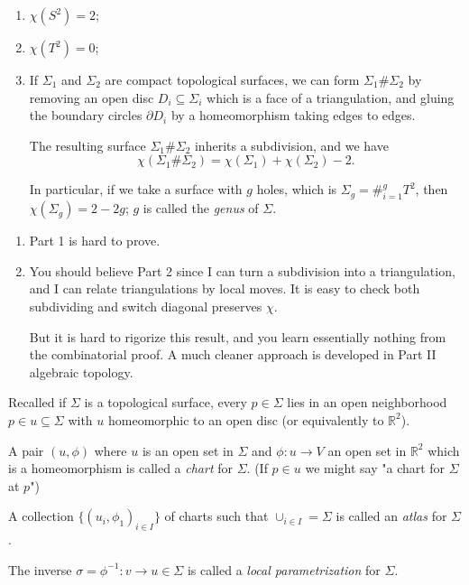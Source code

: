 \begin{example}
    \leavevmode
    \begin{enumerate}
        \item \(\chi(S^2) = 2\);
        \item \(\chi(T^2) = 0\);
        \item If \(\Sigma_1\) and \(\Sigma_{2}\) are compact topological surfaces, we can form \(\Sigma_1 \# \Sigma_2\) by removing an open disc \(D_i \subseteq \Sigma_i\) which is a face of a triangulation, and gluing the boundary circles \(\partial D_i\) by a homeomorphism taking edges to edges.
        
        The resulting surface \(\Sigma_1 \# \Sigma_2\) inherits a subdivision, and we have
        \[
            \chi (\Sigma_1 \# \Sigma_2) = \chi(\Sigma_1) + \chi(\Sigma_{2}) - 2.
        \]

        In particular, if we take a surface with \(g\) holes, which is \(\Sigma_g = \#^{g}_{i=1}T^2\), then \(\chi(\Sigma_g) = 2 - 2g\); \(g\) is called the \textit{genus} of \(\Sigma\).
    \end{enumerate}
\end{example}
\begin{remark}
    \leavevmode
    \begin{enumerate}
        \item Part 1 is hard to prove.
        \item You should believe Part 2 since I can turn a subdivision into a triangulation, and I can relate triangulations by local moves. It is easy to check both subdividing and switch diagonal preserves \(\chi\).

        But it is hard to rigorize this result, and you learn essentially nothing from the combinatorial proof. A much cleaner approach is developed in Part II algebraic topology.
    \end{enumerate}
\end{remark}
Recalled if \(\Sigma\) is a topological surface, every \(p \in \Sigma\) lies in an open neighborhood \(p \in u \subseteq \Sigma\) with \(u\) homeomorphic to an open disc (or equivalently to \(\mathbb{R}^2\)).
\begin{definition}{}{}
    A pair \((u, \phi)\) where \(u\) is an open set in \(\Sigma\) and \(\phi : u \to V \) an open set in \(\mathbb{R}^2\) which is a homeomorphism is called a \textit{chart} for \(\Sigma\). (If \(p\in u\) we might say "a chart for \(\Sigma\) at \(p\)")

    A collection \(\{(u_i, \phi_1)_{i\in I}\}\) of charts such that \(\cup_{i\in I} = \Sigma\) is called an \textit{atlas} for \(\Sigma\).

    The inverse \(\sigma = \phi^{-1}:v \to u \in \Sigma\) is called a \textit{local parametrization} for \(\Sigma\).
\end{definition}
